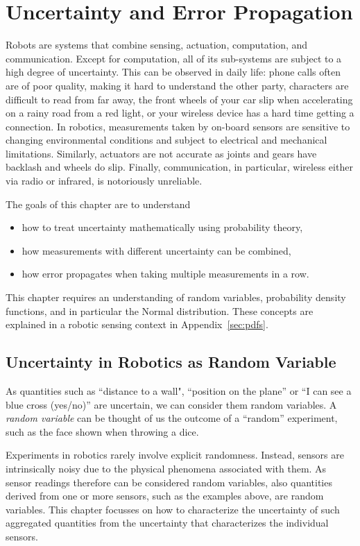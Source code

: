 \chapter{Uncertainty and Error Propagation}\label{chap:uncertainty}
Robots are systems that combine sensing, actuation, computation, and communication. Except for computation, all of its sub-systems are subject to a high degree of uncertainty. This can be observed in daily life: phone calls often are of poor quality, making it hard to understand the other party, characters are difficult to read from far away,  the front wheels of your car slip when accelerating on a rainy road from a red light, or your wireless device has a hard time getting a connection. In robotics, measurements taken by on-board sensors are sensitive to changing environmental conditions and subject to electrical and mechanical limitations. Similarly, actuators are not accurate as joints and gears have backlash and wheels do slip. Finally, communication, in particular, wireless either via radio or infrared, is notoriously unreliable.

The goals of this chapter are to understand
\begin{itemize}
\item how to treat uncertainty mathematically using probability theory,
\item how measurements with different uncertainty can be combined,
\item how error propagates when taking multiple measurements in a row.
\end{itemize}

This chapter requires an understanding of random variables, probability density functions, and in particular the Normal distribution. These concepts are explained in a robotic sensing context in Appendix~\ref{sec:pdfs}.

\section{Uncertainty in Robotics as Random Variable}
As quantities such as ``distance to a wall", ``position on the plane'' or ``I can see a blue cross (yes/no)'' are uncertain, we can consider them random variables. A \emph{random variable} can be thought of us the outcome of a ``random'' experiment, such as the face shown when throwing a dice.

Experiments in robotics rarely involve explicit randomness. Instead, sensors are intrinsically noisy due to the physical phenomena associated with them. As sensor readings therefore can be considered random variables, also quantities derived from one or more sensors, such as the examples above, are random variables. This chapter focusses on how to characterize the uncertainty of such aggregated quantities from the uncertainty that characterizes the individual sensors.

